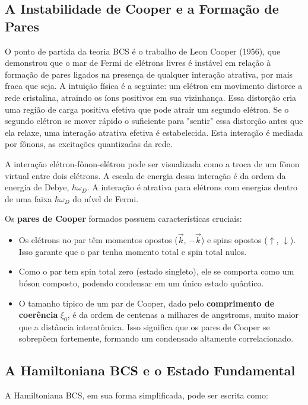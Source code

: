 \documentclass[12pt, a4paper, oneside]{report}
\begin{document}
\subsection{A Instabilidade de Cooper e a Formação de Pares}

O ponto de partida da teoria BCS é o trabalho de Leon Cooper (1956), que demonstrou que o mar de Fermi de elétrons livres é instável em relação à formação de pares ligados na presença de qualquer interação atrativa, por mais fraca que seja. A intuição física é a seguinte: um elétron em movimento distorce a rede cristalina, atraindo os íons positivos em sua vizinhança. Essa distorção cria uma região de carga positiva efetiva que pode atrair um segundo elétron. Se o segundo elétron se mover rápido o suficiente para "sentir" essa distorção antes que ela relaxe, uma interação atrativa efetiva é estabelecida. Esta interação é mediada por fônons, as excitações quantizadas da rede.

A interação elétron-fônon-elétron pode ser visualizada como a troca de um fônon virtual entre dois elétrons. A escala de energia dessa interação é da ordem da energia de Debye, $\hbar \omega_D$. A interação é atrativa para elétrons com energias dentro de uma faixa $\hbar \omega_D$ do nível de Fermi.

Os \textbf{pares de Cooper} formados possuem características cruciais:
\begin{itemize}
    \item Os elétrons no par têm momentos opostos ($\vec{k}$, $-\vec{k}$) e spins opostos ($\uparrow$, $\downarrow$). Isso garante que o par tenha momento total e spin total nulos.
    \item Como o par tem spin total zero (estado singleto), ele se comporta como um bóson composto, podendo condensar em um único estado quântico.
    \item O tamanho típico de um par de Cooper, dado pelo \textbf{comprimento de coerência} $\xi_0$, é da ordem de centenas a milhares de angstroms, muito maior que a distância interatômica. Isso significa que os pares de Cooper se sobrepõem fortemente, formando um condensado altamente correlacionado.
\end{itemize}

\subsection{A Hamiltoniana BCS e o Estado Fundamental}

A Hamiltoniana BCS, em sua forma simplificada, pode ser escrita como:
\end{document}
